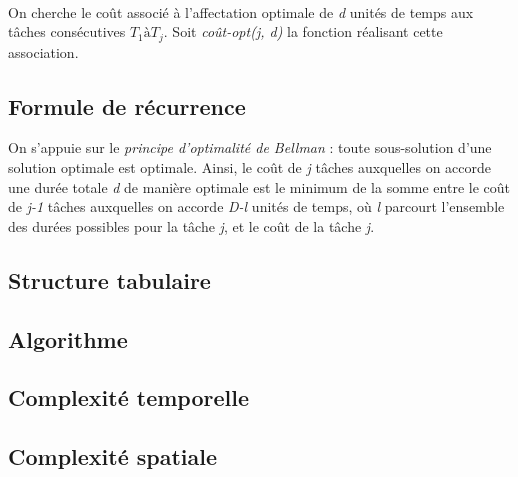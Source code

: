 \documentclass[a4paper, titlepage]{article}
\begin{document}
	\paragraph{}
		On cherche le coût associé à l'affectation optimale de \emph{d} unités de temps aux tâches consécutives $T_{1} à T_{j}$. Soit \emph{coût-opt(j, d)} la fonction réalisant cette association.

	\subsection{Formule de récurrence}
		On s'appuie sur le \emph{principe d'optimalité de Bellman} : toute sous-solution d'une solution optimale est optimale. Ainsi, le coût de \emph{j} tâches auxquelles on accorde une durée totale \emph{d} de manière optimale est le minimum de la somme entre le coût de \emph{j-1} tâches auxquelles on accorde \emph{D-l} unités de temps, où \emph{l} parcourt l'ensemble des durées possibles pour la tâche \emph{j}, et le coût de la tâche \emph{j}.
	\subsection{Structure tabulaire}
	\subsection{Algorithme}
	\subsection{Complexité temporelle}
	\subsection{Complexité spatiale}
\end{document}
